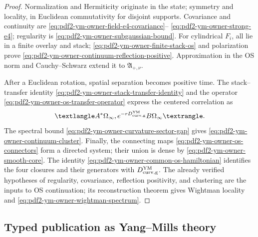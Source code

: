 \begin{proof}
Normalization and Hermiticity originate in the state; symmetry and locality, in
Euclidean commutativity for disjoint supports. Covariance and continuity are
\eqref{eq:pdf2-ym-owner-field-e4-covariance}--
\eqref{eq:pdf2-ym-owner-strong-e4}; regularity is
\eqref{eq:pdf2-ym-owner-subgaussian-bound}. For cylindrical
$F_i$, all lie in a finite overlay and stack;
\eqref{eq:pdf2-ym-owner-finite-stack-os} and polarization prove
\eqref{eq:pdf2-ym-owner-continuum-reflection-positive}. Approximation in the OS norm
and Cauchy--Schwarz extend it to $\mathfrak A_{+,\nu}$.

After a Euclidean rotation, spatial separation becomes positive time.
The stack--transfer identity
\eqref{eq:pdf2-ym-owner-stack-transfer-identity} and the operator
\eqref{eq:pdf2-ym-owner-os-transfer-operator} express the centered correlation as
\[
 \langle A^*\Omega_\infty,
 e^{-rD_{\rm curv,g}^{\rm YM}}B\Omega_\infty\rangle.
\]
The spectral bound \eqref{eq:pdf2-ym-owner-curvature-sector-gap} gives
\eqref{eq:pdf2-ym-owner-continuum-cluster}. Finally, the connecting maps
\eqref{eq:pdf2-ym-owner-os-connectors} form a directed system; their union is dense
by \eqref{eq:pdf2-ym-owner-smooth-core}. The identity
\eqref{eq:pdf2-ym-owner-common-os-hamiltonian} identifies the four closures and their
generators with $D_{\rm curv,g}^{\rm YM}$. The already verified hypotheses of regularity,
covariance, reflection positivity, and clustering are the inputs to OS continuation; its reconstruction
theorem gives Wightman locality and
\eqref{eq:pdf2-ym-owner-wightman-spectrum}.
\end{proof}

\subsection{Typed publication as Yang--Mills theory}

